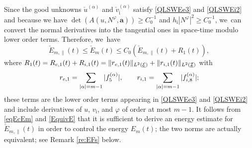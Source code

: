 \documentclass[11pt]{article}
\newcommand{\cI}{{\mathcal I}}
\newcommand{\cE}{{\mathcal E}}
\newcommand{\ul}[1]{\underline{#1}}
\theoremstyle{definition}
\begin{document}
Since the good unknowns $\check{u}^{(\alpha)}$ and $\check{v}_\mathrm{i}^{(\alpha)}$ satisfy \eqref{QLSWEe3} and \eqref{QLSWEi2} and because we have
$\det(A(u,N^\varphi,\bm{a})) \geq C_0^{-1}$ and $h_\mathrm{i}|N^\varphi|^2 \geq C_0^{-1}$, we~can convert the normal derivatives into the tangential ones in space-time modulo lower order terms.
Therefore, we~have
\begin{equation}\label{EquivE}
\check{E}_{m,\parallel}(t) \leq \check{E}_m(t) \leq C_0(\check{E}_{m,\parallel}(t) + R_1(t)),
\end{equation}
where $R_1(t)=R_{{\rm e},1}(t)+R_{{\rm i},1}(t)=\|r_{{\rm e},1}(t)\|_{L^2(\ul{\cE})}+\|r_{{\rm i},1}(t)\|_{L^2(\ul{\cI})}$ with
\[
r_{{\rm e},1} = \sum_{|\alpha|=m-1} |f_5^{(\alpha)}|, \qquad
r_{{\rm i},1} = \sum_{|\alpha|=m-1} |f_{{\rm i},8}^{(\alpha)}|;
\]
these terms are the lower order terms appearing in \eqref{QLSWEe3} and \eqref{QLSWEi2}
and include derivatives of $u$, $v_\mathrm{i}$, and $\varphi$ of order at most $m-1$.
It follows from \eqref{eqEcEm} and \eqref{EquivE} that it is sufficient to derive an energy estimate for $\check{E}_{m,\parallel}(t)$
in order to control the energy $E_m(t)$; the two norms are actually equivalent; see Remark \ref{re:EFs} below.
\end{document}
